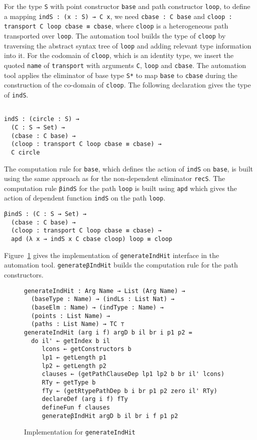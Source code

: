 \documentclass[sigplan,10pt]{acmart}
\begin{document}
For the type {\tt S} with point constructor {\tt base} and path constructor {\tt loop}, to define a mapping {\tt indS : (x : S) → C x}, we need {\tt cbase : C base} and {\tt cloop : transport C loop cbase ≡ cbase}, where {\tt cloop} is a heterogeneous path transported over {\tt loop}. The automation tool builds the type of {\tt cloop} by traversing the abstract syntax tree of {\tt loop} and adding relevant type information into it. For the codomain of {\tt cloop}, which is an identity type, we insert the quoted {\tt name} of {\tt transport} with arguments {\tt C}, {\tt loop} and {\tt cbase}. The automation tool applies the eliminator of base type {\tt S*} to map {\tt base} to {\tt cbase} during the construction of the co-domain of {\tt cloop}. The following declaration gives the type of {\tt indS}.
\begin{center}
\begin{BVerbatim}

indS : (circle : S) → 
  (C : S → Set) →
  (cbase : C base) →
  (cloop : transport C loop cbase ≡ cbase) →
  C circle
\end{BVerbatim}
\end{center}

The computation rule for {\tt base}, which defines the action of {\tt indS} on {\tt base}, is built using the same approach as for the non-dependent eliminator {\tt recS}. The computation rule {\tt βindS} for the path {\tt loop} is built using {\tt apd} which gives the action of dependent function {\tt indS} on the path {\tt loop}.
\begin{center}
\begin{BVerbatim}
βindS : (C : S → Set) → 
  (cbase : C base) → 
  (cloop : transport C loop cbase ≡ cbase) → 
  apd (λ x → indS x C cbase cloop) loop ≡ cloop

\end{BVerbatim}
\end{center}

Figure~\ref{fig:generateIndHit} gives the implementation of {\tt generateIndHit} interface in the automation tool. {\tt generateβIndHit} builds the computation rule for the path constructors.

\begin{figure}
\begin{center}
\fontsize{7pt}{9pt}\selectfont
\begin{Verbatim}
generateIndHit : Arg Name → List (Arg Name) →
  (baseType : Name) → (indLs : List Nat) →
  (baseElm : Name) → (indType : Name) →
  (points : List Name) → 
  (paths : List Name) → TC ⊤
generateIndHit (arg i f) argD b il br i p1 p2 =
  do il' ← getIndex b il
     lcons ← getConstructors b
     lp1 ← getLength p1
     lp2 ← getLength p2
     clauses ← (getPathClauseDep lp1 lp2 b br il' lcons)
     RTy ← getType b
     fTy ← (getRtypePathDep b i br p1 p2 zero il' RTy)
     declareDef (arg i f) fTy
     defineFun f clauses
     generateβIndHit argD b il br i f p1 p2
\end{Verbatim}
\end{center}
\caption{Implementation for {\tt generateIndHit}}
\label{fig:generateIndHit}
\end{figure}
\normalsize
\end{document}

